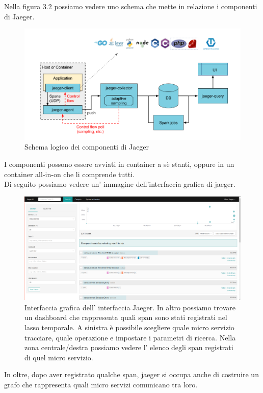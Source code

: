 \documentclass[a4paper,12pt,titlepage,italian,openany]{report}
\begin{document}
Nella figura 3.2 possiamo vedere uno schema che mette in relazione i componenti di Jaeger.
\begin{figure}[H]
    \includegraphics[scale=0.4]{32.png}
    \centering
    \caption{Schema logico dei componenti di Jaeger}
\end{figure}
I componenti possono essere avviati in container a sè stanti, oppure in un container all-in-on che li comprende tutti.\\
Di seguito possiamo vedere un' immagine dell'interfaccia grafica di jaeger.
\begin{figure}[H]
    \includegraphics[scale=0.21]{48.png}
    \centering
    \caption{Interfaccia grafica dell' interfaccia Jaeger. In altro possiamo trovare un dashboard che rappresenta quali span sono stati registrati nel lasso temporale. A sinistra è possibile scegliere quale micro servizio tracciare, quale operazione e impostare i parametri di ricerca. Nella zona
    centrale/destra possiamo vedere l' elenco degli span registrati di quel micro servizio.}
    
\end{figure}

In oltre, dopo aver registrato qualche span, jaeger si occupa anche di costruire un grafo che rappresenta quali micro servizi comunicano tra loro.
\end{document}
